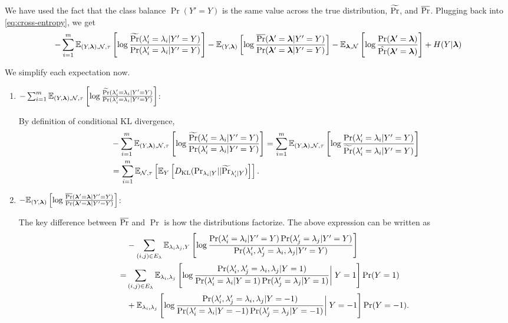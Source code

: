 We have used the fact that the class balance $\Pr(Y' = Y)$ is the same value across the true distribution, $\widetilde{\Pr}$, and $\overline{\Pr}$. Plugging back into \eqref{eq:cross-entropy}, we get 
\begin{align}
    -\sum_{i = 1}^m \mathbb{E}_{(Y, \bm{\lambda}), \mathcal{N}, \tau}\left[\log \frac{\widetilde{\Pr}(\lambda_i' = \lambda_i | Y' = Y)}{\Pr(\lambda_i' = \lambda_i | Y' = Y)}\right] - \mathbb{E}_{(Y, \bm{\lambda})}\left[\log \frac{\overline{\Pr}(\bm{\lambda}' = \bm{\lambda} | Y' = Y)}{\Pr(\bm{\lambda}' = \bm{\lambda} | Y' = Y)}\right] - \mathbb{E}_{\bm{\lambda}, \mathcal{N}}\left[\log \frac{\Pr(\bm{\lambda}' = \bm{\lambda})}{\hat{\Pr}(\bm{\lambda}' = \bm{\lambda})}\right] + H(Y | \bm{\lambda}) \label{eq:cross-entropy-2}
\end{align}

We simplify each expectation now. 

\begin{enumerate}
    \item $ -\sum_{i = 1}^m \mathbb{E}_{(Y, \bm{\lambda}), \mathcal{N}, \tau}\left[\log \frac{\widetilde{\Pr}(\lambda_i' = \lambda_i | Y' = Y)}{\Pr(\lambda_i' = \lambda_i | Y' = Y)}\right]$:
    
    By definition of conditional KL divergence,
    \begin{align}
        &-\sum_{i = 1}^m \mathbb{E}_{(Y, \bm{\lambda}), \mathcal{N}, \tau}\left[\log \frac{\widetilde{\Pr}(\lambda_i' = \lambda_i | Y' = Y)}{\Pr(\lambda_i' = \lambda_i | Y' = Y)}\right] = \sum_{i = 1}^m \mathbb{E}_{(Y, \bm{\lambda}), \mathcal{N}, \tau}\left[ \log \frac{\Pr(\lambda_i' = \lambda_i | Y' = Y )}{\widetilde{\Pr}(\lambda_i' = \lambda_i | Y' = Y)}\right] \\
        &=\sum_{i = 1}^m \mathbb{E}_{\mathcal{N}, \tau}\left[\mathbb{E}_{Y}\left[D_{\mathrm{KL}}(\mathrm{Pr}_{\lambda_i | Y} || \widetilde{\Pr}_{\lambda_i' | Y})\right]\right].
    \end{align}
    
    \item $- \mathbb{E}_{(Y, \bm{\lambda})}\left[\log \frac{\overline{\Pr}(\bm{\lambda}' = \bm{\lambda} | Y' = Y)}{\Pr(\bm{\lambda}' = \bm{\lambda} | Y' = Y)}\right]$:

    The key difference between $\overline{\Pr}$ and $\Pr$ is how the distributions factorize. The above expression can be written as
    \begin{align*}
    &-\sum_{(i, j) \in E_{\lambda}} \mathbb{E}_{\lambda_i \lambda_j, Y}\left[\log \frac{\Pr(\lambda_i' = \lambda_i | Y' = Y) \Pr(\lambda_j' = \lambda_j | Y' = Y)}{\Pr(\lambda_i', \lambda_j' = \lambda_i, \lambda_j | Y' = Y)}\right] \\
    =& \sum_{(i, j) \in E_{\lambda}} \mathbb{E}_{\lambda_i, \lambda_j}\left[ \log \frac{\Pr(\lambda_i', \lambda_j' = \lambda_i, \lambda_j | Y = 1)}{\Pr(\lambda_i' = \lambda_i | Y = 1) \Pr(\lambda_j' = \lambda_j | Y = 1)} \bigg| \; Y = 1\right] \Pr(Y = 1)  \\
    &+ \mathbb{E}_{\lambda_i, \lambda_j}\left[ \log \frac{\Pr(\lambda_i', \lambda_j' = \lambda_i, \lambda_j | Y = -1)}{\Pr(\lambda_i' = \lambda_i | Y = -1) \Pr(\lambda_j' = \lambda_j | Y = -1)} \bigg| \; Y = -1\right] \Pr(Y = -1).
    \end{align*}
    

\end{enumerate}
